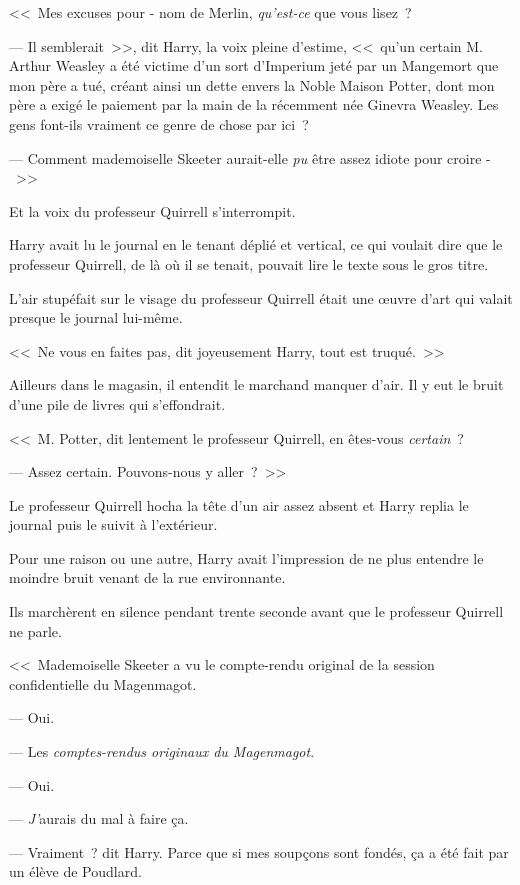 <<~Mes excuses pour - nom de Merlin, \emph{qu'est-ce} que vous lisez~?

--- Il semblerait~>>, dit Harry, la voix pleine d'estime, <<~qu'un certain M. Arthur Weasley a été victime d'un sort d'Imperium jeté par un Mangemort que mon père a tué, créant ainsi un dette envers la Noble Maison Potter, dont mon père a exigé le paiement par la main de la récemment née Ginevra Weasley. Les gens font-ils vraiment ce genre de chose par ici~?

--- Comment mademoiselle Skeeter aurait-elle \emph{pu} être assez idiote pour croire -~>>

Et la voix du professeur Quirrell s'interrompit.

Harry avait lu le journal en le tenant déplié et vertical, ce qui voulait dire que le professeur Quirrell, de là où il se tenait, pouvait lire le texte sous le gros titre.

L'air stupéfait sur le visage du professeur Quirrell était une œuvre d'art qui valait presque le journal lui-même.

<<~Ne vous en faites pas, dit joyeusement Harry, tout est truqué.~>>

Ailleurs dans le magasin, il entendit le marchand manquer d'air. Il y eut le bruit d'une pile de livres qui s'effondrait.

<<~M. Potter, dit lentement le professeur Quirrell, en êtes-vous \emph{certain}~?

--- Assez certain. Pouvons-nous y aller~?~>>

Le professeur Quirrell hocha la tête d'un air assez absent et Harry replia le journal puis le suivit à l'extérieur.

Pour une raison ou une autre, Harry avait l'impression de ne plus entendre le moindre bruit venant de la rue environnante.

Ils marchèrent en silence pendant trente seconde avant que le professeur Quirrell ne parle.

<<~Mademoiselle Skeeter a vu le compte-rendu original de la session confidentielle du Magenmagot.

--- Oui.

--- Les \emph{comptes-rendus originaux du Magenmagot}.

--- Oui.

--- \emph{J'}aurais du mal à faire ça.

--- Vraiment~? dit Harry. Parce que si mes soupçons sont fondés, ça a été fait par un élève de Poudlard.

